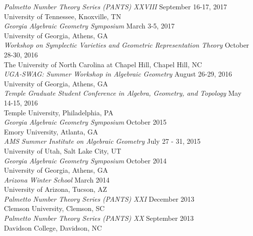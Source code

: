 \documentclass{article}
\begin{document}
\noindent\textsl{Palmetto Number Theory Series (PANTS) XXVIII} \hfill September 16-17, 2017\\
University of Tennessee, Knoxville, TN\\

\noindent\textsl{Georgia Algebraic Geometry Symposium} \hfill March 3-5, 2017\\
University of Georgia, Athens, GA\\

\noindent\textsl{Workshop on Symplectic Varieties and Geometric Representation Theory} \hfill October 28-30, 2016\\
The University of North Carolina at Chapel Hill, Chapel Hill, NC\\

\noindent\textsl{UGA-SWAG: Summer Workshop in Algebraic Geometry} \hfill August 26-29, 2016\\
University of Georgia, Athens, GA\\

\noindent\textsl{Temple Graduate Student Conference in Algebra, Geometry, and Topology} \hfill May 14-15, 2016\\
Temple University, Philadelphia, PA\\

\noindent\textsl{Georgia Algebraic Geometry Symposium} \hfill October 2015\\
Emory University, Atlanta, GA\\

\noindent\textsl{AMS Summer Institute on Algebraic Geometry} \hfill July 27 - 31, 2015\\
University of Utah, Salt Lake City, UT\\

\noindent\textsl{Georgia Algebraic Geometry Symposium} \hfill October 2014\\
University of Georgia, Athens, GA\\

\noindent\textsl{Arizona Winter School} \hfill March 2014\\
University of Arizona, Tucson, AZ\\

\noindent\textsl{Palmetto Number Theory Series (PANTS) XXI} \hfill December 2013\\
Clemson University, Clemson, SC\\

\noindent\textsl{Palmetto Number Theory Series (PANTS) XX} \hfill September 2013\\
Davidson College, Davidson, NC\\
\end{document}
